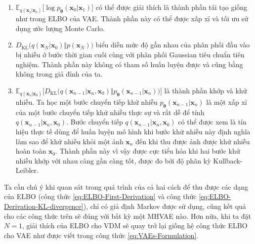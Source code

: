 \documentclass[14pt, a4paper]{article}
\numberwithin{equation}{section}
\numberwithin{figure}{section}
\numberwithin{dl}{section}
\numberwithin{md}{section}
\numberwithin{bd}{section}
\numberwithin{dn}{section}
\numberwithin{hq}{section}
\begin{document}
    \begin{enumerate}
        \item $\mathbb{E}_{q(\boldsymbol{x}_1 \vert \boldsymbol{x}_0)} \lbrack \log p_{\boldsymbol{\theta}} (\boldsymbol{x}_0 \vert \boldsymbol{x}_1) \rbrack$ có thể được giải thích là thành phần tái tạo giống như trong ELBO của VAE.
        Thành phần này có thể được xấp xỉ và tối ưu sử dụng ước lượng Monte Carlo.
        \item $D_{\mathrm{KL}} \big( q(\boldsymbol{x}_N \vert \boldsymbol{x}_0) \Vert p(\boldsymbol{x}_N) \big)$ biểu diễn mức độ gần nhau của phân phối đầu vào bị nhiễu ở bước thời gian cuối cùng với phân phối Gaussian tiêu chuẩn tiên nghiệm.
        Thành phần này không có tham số huấn luyện được và cũng bằng không trong giả đỉnh của ta.
        \item $\mathbb{E}_{q(\boldsymbol{x}_n \vert \boldsymbol{x}_0)} \lbrack D_{\mathrm{KL}} \big( q(\boldsymbol{x}_{n-1} \vert \boldsymbol{x}_n, \boldsymbol{x}_0) \Vert p_{\boldsymbol{\theta}} (\boldsymbol{x}_{n-1} \vert \boldsymbol{x}_n) \big) \rbrack$ là thành phần khớp và khử nhiễu.
        Ta học một bước chuyển tiếp khử nhiễu $p_{\boldsymbol{\theta}} (\boldsymbol{x}_{n-1} \vert \boldsymbol{x}_n)$ là một xấp xỉ của một bước chuyển tiếp khử nhiễu thực sự và rất dễ để tính $q(\boldsymbol{x}_{n-1} \vert \boldsymbol{x}_n, \boldsymbol{x}_0)$.
        Bước chuyển tiếp $q(\boldsymbol{x}_{n-1} \vert \boldsymbol{x}_n, \boldsymbol{x}_0)$ có thể được xem là tín hiệu thực tế dùng để huấn luyện mô hình khi bước khử nhiễu này định nghĩa làm sao để khử nhiễu khỏi một ảnh $\boldsymbol{x}_n$ đến khi thu được ảnh được khử nhiễu hoàn toàn $\boldsymbol{x}_0$.
        Thành phần này vì vậy được cực tiểu hóa khi hai bước khử nhiễu khớp với nhau càng gần càng tốt, được đo bởi độ phân kỳ Kullback-Leibler.
    \end{enumerate}

    Ta cần chú ý khi quan sát trong quá trình của cả hai cách để thu được các dạng của ELBO (công thức \ref{eq:ELBO-First-Derivation} và công thức \ref{eq:ELBO-Derivation-KL-divergence}), chỉ có giả định Markov được sử dụng, cũng kết quả cho các công thức trên sẽ đúng với bất kỳ một MHVAE nào.
    Hơn nữa, khi ta đặt $N=1$, giải thích của ELBO cho VDM sẽ quay trở lại giống hệ công thức ELBO cho VAE như được viết trong công thức \ref{eq:VAEs-Formulation}.
\end{document}
